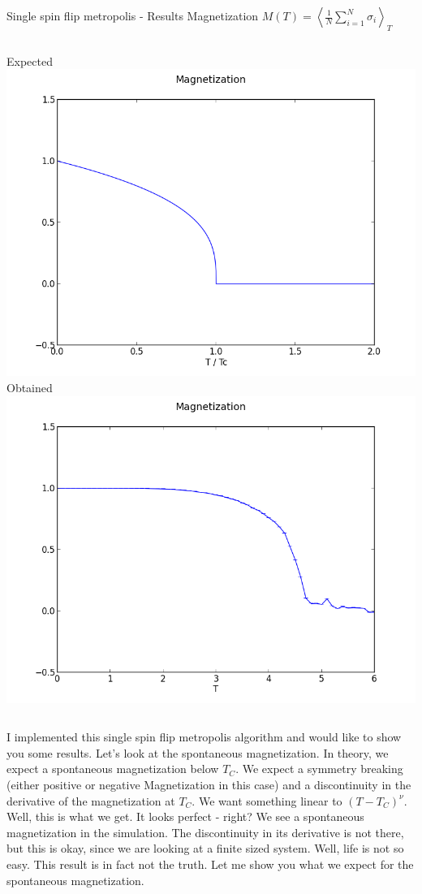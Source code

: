 \documentclass[handout]{beamer}
\begin{document}
\begin{frame}{Single spin flip metropolis - Results}
\pause
Magnetization \( M(T) = \left< \frac{1}{N} \sum\limits_{i=1}^N \sigma_i \right>_T \)
\begin{columns}[c]
	\pause
	\centering Expected
	\includegraphics[width=\textwidth]{img/single_magnetization_theoretical.png}
	\pause
	\centering Obtained
	\includegraphics[width=\textwidth]{img/single_magnetization_size15.png}
\end{columns}
 {I implemented this single spin flip metropolis algorithm and would like to show you some results.}
 {Let's look at the spontaneous magnetization.}
 {In theory, we expect a spontaneous magnetization below \(T_C\). We expect a symmetry breaking (either positive or negative Magnetization in this case) and a discontinuity in the derivative of the magnetization at \(T_C\). We want something linear to \( (T-T_C)^\nu \).}
 {Well, this is what we get. It looks perfect - right? We see a spontaneous magnetization in the simulation. The discontinuity in its derivative is not there, but this is okay, since we are looking at a finite sized system.
Well, life is not so easy. This result is in fact not the truth. Let me show you what we expect for the spontaneous magnetization.}
\end{frame}
\end{document}
